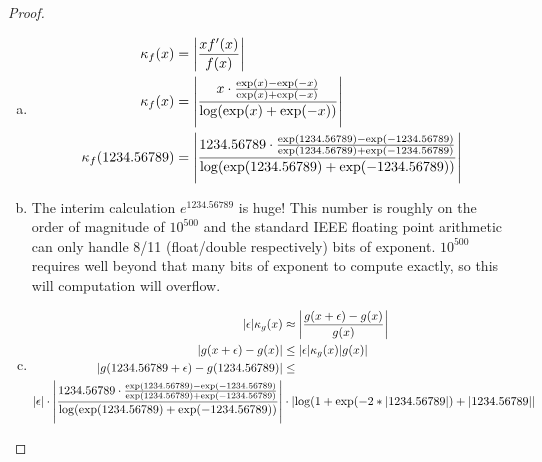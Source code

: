 \documentclass{article}
\DeclarePairedDelimiter{\abs}{\lvert}{\rvert}
\theoremstyle{definition}
\begin{document}
\begin{proof}
    \begin{enumerate}[(a)]
        \item
        \begin{align*}
            \kappa_f(x) &= \abs*{\frac{xf'(x)}{f(x)}} \\
            \kappa_f(x) &= \abs*{\frac{x\cdot \frac{\exp(x) - \exp(-x)}{\exp(x) + \exp(-x)}}{\log(\exp(x) + \exp(-x))}} \\
            \kappa_f(1234.56789) &= \abs*{\frac{1234.56789\cdot \frac{\exp(1234.56789) - \exp(-1234.56789)}{\exp(1234.56789) + \exp(-1234.56789)}}{\log(\exp(1234.56789) + \exp(-1234.56789))}} \\
        \end{align*}
        \item The interim calculation $e^{1234.56789}$ is huge! This number is roughly on the order of magnitude of $10^{500}$ and the standard IEEE floating point arithmetic can only handle 8/11 (float/double respectively) bits of exponent. $10^{500}$ requires well beyond that many bits of exponent to compute exactly, so this will computation will overflow.
        \item
        \begin{align*}
            \abs{\epsilon}\kappa_g(x) &\approx \abs*{\frac{g(x + \epsilon) - g(x)}{g(x)}} \\
            \abs{g(x + \epsilon) - g(x)} &\leq \abs{\epsilon}\kappa_g(x)|g(x)| \\
            \abs{g(1234.56789 + \epsilon) - g(1234.56789)} &\leq \\ \abs{\epsilon} \cdot 
            \abs*{\frac{1234.56789\cdot \frac{\exp(1234.56789) - \exp(-1234.56789)}{\exp(1234.56789) + \exp(-1234.56789)}}{\log(\exp(1234.56789) + \exp(-1234.56789))}} &\cdot 
            \abs*{\log(1 + \exp(-2*\abs{1234.56789}) + \abs{1234.56789}} \\ 
        \end{align*}
    \end{enumerate}
\end{proof}
\end{document}
